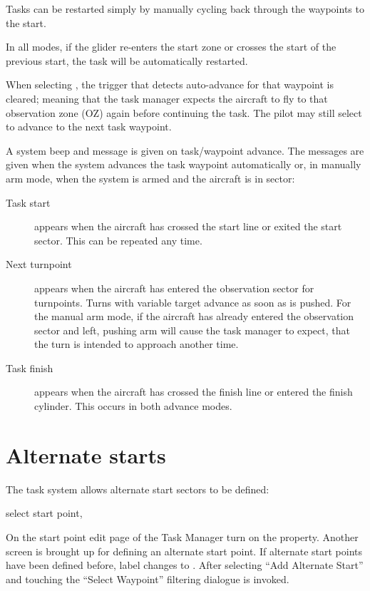 \tip{} Tasks can be restarted simply by manually cycling back through the
waypoints to the start.

In all modes, if the glider re-enters the start zone or crosses the
start of the previous start, the task will be automatically restarted. 

When selecting , the trigger that detects
auto-advance for that waypoint is cleared; meaning that the task
manager expects the aircraft to fly to that observation zone (OZ)
again before continuing the task. The pilot may still select  to advance to the next task waypoint.

A system beep and message is given on task/waypoint advance.  The
messages are given when the system advances the task waypoint
automatically or, in manually arm mode, when the system is armed and the
aircraft is in sector:
\begin{description}
\item[Task start]  appears when the aircraft has crossed the start line or
 exited the start sector. This can be repeated any time.
\item[Next turnpoint]  appears when the aircraft has entered the observation
 sector for turnpoints. Turns with variable target advance as soon as
  is pushed.  For the manual arm mode, if the
 aircraft has already entered the observation sector and left, pushing arm will
 cause the task manager to expect, that the turn is intended to approach
 another time.
\item[Task finish]  appears when the aircraft has crossed the finish line
 or entered the finish cylinder.  This occurs in both advance modes. 
\end{description}


\section{Alternate starts}\label{sec:alternate-starts}

The task system allows alternate start sectors to be defined:

\blink{} select start point, \blink{}

On the start point edit page of the Task Manager turn on the  property. Another screen is brought up for defining an 
alternate start point. If alternate start points have been defined before, label  changes to . After selecting ``Add Alternate Start'' and touching
 the ``Select Waypoint'' filtering dialogue is invoked.

